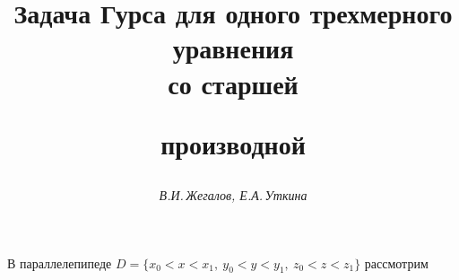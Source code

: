 

 


% 




 


\setcounter{page}{77} 












 


\author{\it В.И.\,Жегалов, Е.А.\,Уткина} 




\title{Задача Гурса для одного трехмерного уравнения\\ со старшей 


производной} 


 


\date{} 




\pagestyle{plain} %


 




\maketitle 


\label{begin} 


 


В параллелепипеде $D=\{x_0<x<x_1,\ y_0<y<y_1,\ z_0<z<z_1\}$ рассмотрим 


